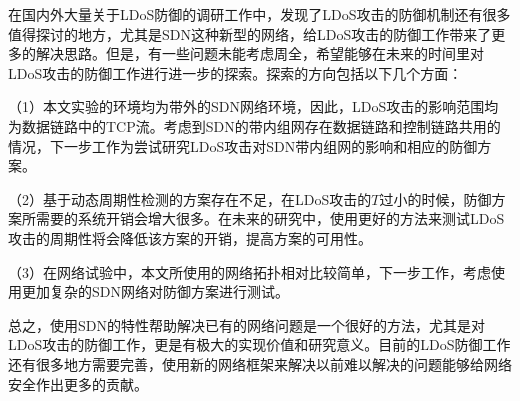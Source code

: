 在国内外大量关于LDoS防御的调研工作中，发现了LDoS攻击的防御机制还有很多值得探讨的地方，尤其是SDN这种新型的网络，给LDoS攻击的防御工作带来了更多的解决思路。但是，有一些问题未能考虑周全，希望能够在未来的时间里对LDoS攻击的防御工作进行进一步的探索。探索的方向包括以下几个方面：

（1）本文实验的环境均为带外的SDN网络环境，因此，LDoS攻击的影响范围均为数据链路中的TCP流。考虑到SDN的带内组网存在数据链路和控制链路共用的情况，下一步工作为尝试研究LDoS攻击对SDN带内组网的影响和相应的防御方案。

（2）基于动态周期性检测的方案存在不足，在LDoS攻击的$T$过小的时候，防御方案所需要的系统开销会增大很多。在未来的研究中，使用更好的方法来测试LDoS攻击的周期性将会降低该方案的开销，提高方案的可用性。

（3）在网络试验中，本文所使用的网络拓扑相对比较简单，下一步工作，考虑使用更加复杂的SDN网络对防御方案进行测试。

总之，使用SDN的特性帮助解决已有的网络问题是一个很好的方法，尤其是对LDoS攻击的防御工作，更是有极大的实现价值和研究意义。目前的LDoS防御工作还有很多地方需要完善，使用新的网络框架来解决以前难以解决的问题能够给网络安全作出更多的贡献。